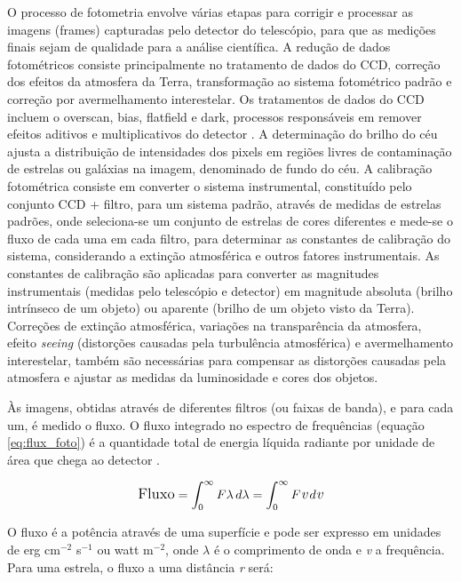 O processo de fotometria envolve várias etapas para corrigir e processar as imagens (frames) capturadas pelo detector do telescópio, para que as medições finais sejam de qualidade para a análise científica. A redução de dados fotométricos consiste principalmente no tratamento de dados do CCD, correção dos efeitos da atmosfera da Terra, transformação ao sistema fotométrico padrão e correção por avermelhamento interestelar. Os tratamentos de dados do CCD incluem o overscan, bias, flatfield e dark, processos responsáveis em remover efeitos aditivos e multiplicativos do detector \cite{2023Kepler}. A determinação do brilho do céu ajusta a distribuição de intensidades dos pixels em regiões livres de contaminação de estrelas ou galáxias na imagem, denominado de fundo do céu. A calibração fotométrica consiste em converter o sistema instrumental, constituído pelo conjunto CCD + filtro, para um sistema padrão, através de medidas de estrelas padrões, onde seleciona-se um conjunto de estrelas de cores diferentes e mede-se o fluxo de cada uma em cada filtro, para determinar as constantes de calibração do sistema, considerando a extinção atmosférica e outros fatores instrumentais. As constantes de calibração são aplicadas para converter as magnitudes instrumentais (medidas pelo telescópio e detector) em magnitude absoluta (brilho intrínseco de um objeto) ou aparente (brilho de um objeto visto da Terra). Correções de extinção atmosférica, variações na transparência da atmosfera, efeito \emph{seeing} (distorções causadas pela turbulência atmosférica) e avermelhamento interestelar, também são necessárias para compensar as distorções causadas pela atmosfera e ajustar as medidas da luminosidade e cores dos objetos.

Às imagens, obtidas através de diferentes filtros (ou faixas de banda), e para cada um, é medido o fluxo. O fluxo integrado no espectro de frequências (equação \eqref{eq:flux_foto}) é a quantidade total de energia líquida radiante por unidade de área que chega ao detector  \cite{2023Kepler}.

\begin{equation} \label{eq:flux_foto}
\large
\text{Fluxo} = \int_{0}^{\infty} F\lambda \, d\lambda = \int_{0}^{\infty} F\emph{v} \, d\emph{v}
\end{equation}

O fluxo é a potência através de uma  superfície e pode ser expresso em unidades de erg cm\(^{-2}\) s\(^{-1}\) ou watt m\(^{-2}\), onde \(\lambda\) é o comprimento de onda e \emph{v} a frequência. Para uma estrela, o fluxo a uma distância \emph{r} será:

